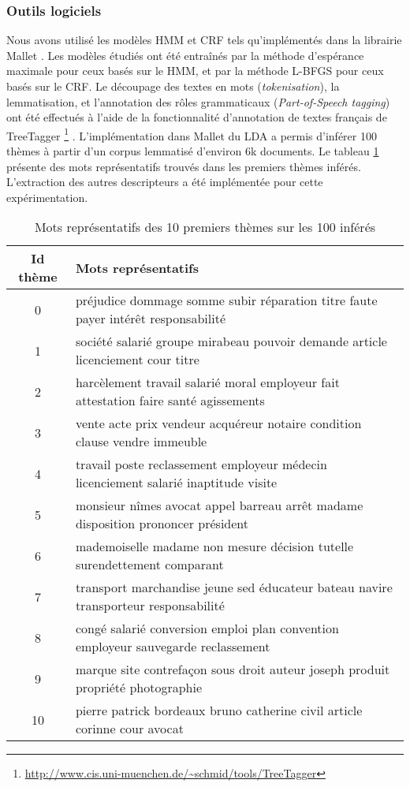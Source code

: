 \subsubsection{Outils logiciels}
Nous avons utilisé les modèles HMM et CRF tels qu'implémentés dans la librairie Mallet \citep{McCallum2012Mallet}. Les modèles étudiés ont été entraînés par la méthode d'espérance maximale pour ceux basés sur le HMM, et par la méthode L-BFGS pour ceux basés sur le CRF. Le découpage des textes en mots (\textit{tokenisation}), la lemmatisation, et l'annotation des rôles grammaticaux (\textit{Part-of-Speech tagging}) ont été effectués à l'aide de la fonctionnalité d'annotation de textes français de TreeTagger \footnote{\url{http://www.cis.uni-muenchen.de/~schmid/tools/TreeTagger}}  \citep{schmid1994treetagger}. L'implémentation dans Mallet du LDA \citep{blei2003lda} a permis d'inférer 100 thèmes à partir d'un corpus lemmatisé d'environ 6k documents. Le tableau \ref{p4_topics} 
présente des mots représentatifs trouvés dans les premiers thèmes inférés. L'extraction des autres descripteurs a été implémentée pour cette expérimentation. 


\begin{table}[!ht]
\scriptsize
\begin{center}
\begin{tabular}{c|l}
Id thème & Mots représentatifs  \\ \hline
0	& 	préjudice  dommage  somme  subir  réparation  titre  faute  payer  intérêt  responsabilité  \\ \hline
1	& société  salarié  groupe  mirabeau  pouvoir  demande  article  licenciement  cour  titre    \\ \hline
2	& harcèlement  travail  salarié  moral  employeur  fait  attestation  faire  santé  agissements  \\ \hline
3	& vente  acte  prix  vendeur  acquéreur  notaire  condition  clause  vendre  immeuble  \\ \hline
4	& 		travail  poste  reclassement  employeur  médecin  licenciement  salarié  inaptitude  visite  \\ \hline
5	& 	monsieur  nîmes  avocat  appel  barreau  arrêt  madame  disposition  prononcer  président  \\ \hline
6	& 	mademoiselle  madame  non  mesure  décision  tutelle  surendettement  comparant   \\ \hline
7	& transport  marchandise  jeune  sed  éducateur  bateau  navire  transporteur  responsabilité  \\ \hline
8	&congé  salarié  conversion  emploi  plan  convention  employeur  sauvegarde  reclassement  \\ \hline
9	&marque  site  contrefaçon  sous  droit  auteur  joseph  produit  propriété  photographie  \\ \hline
10	&pierre  patrick  bordeaux  bruno  catherine  civil  article  corinne  cour  avocat\\ \hline
\end{tabular}
\end{center}
\caption{Mots représentatifs des 10 premiers thèmes sur les 100 inférés}\label{p4_topics}
\end{table}

